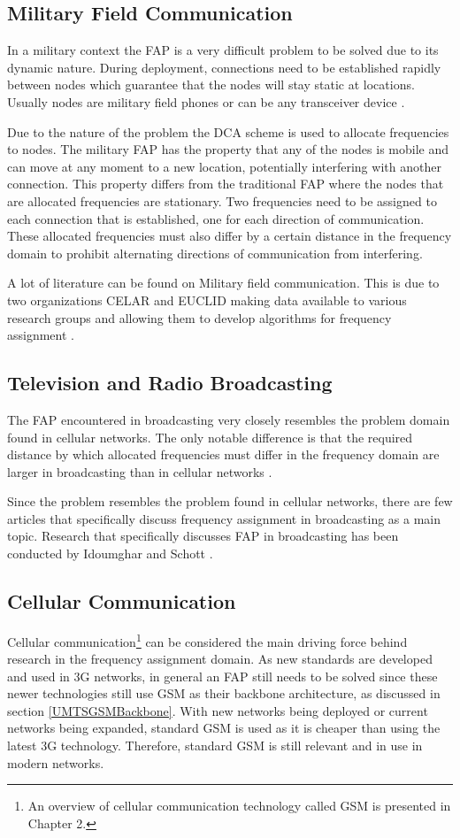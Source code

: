 \subsection{Military Field Communication}
In a military context the FAP is a very difficult problem to be solved due to its dynamic nature\cite{CALMA}. During deployment, connections need to be established rapidly between nodes which guarantee that the nodes will stay static at locations. Usually nodes are military field phones or can be any transceiver device \cite{CALMA,DynamicFAP}. 

Due to the nature of the problem the DCA scheme is used to allocate frequencies to nodes. The military FAP has the property that any of the nodes is mobile and can move at any moment to a new location, potentially interfering with another connection\cite{CALMA,DynamicFAP}. This property differs from the traditional FAP where the nodes that are allocated frequencies are stationary\cite{CALMA}. Two frequencies need to be assigned to each connection that is established, one for each direction of communication. These allocated frequencies must also differ by a certain distance in the frequency domain to prohibit alternating directions of communication from interfering\cite{CALMA,DynamicFAP}.

A lot of literature can be found on Military field communication. This is due to two organizations CELAR and EUCLID making data available to various research groups and allowing them to develop algorithms for frequency assignment \cite{CALMA,DynamicFAP}. 

\subsection{Television and Radio Broadcasting}
The FAP encountered in broadcasting very closely resembles the problem domain found in cellular networks\cite{Karen2004}. The only notable difference is that the required distance by which allocated frequencies must differ in the frequency domain are larger in broadcasting than in cellular networks \cite{Karen2004}.

Since the problem resembles the problem found in cellular networks, there are few articles that specifically discuss frequency assignment in broadcasting as a main topic. Research that specifically discusses FAP in broadcasting has been conducted by Idoumghar and Schott \cite{RadioFAP}.
\subsection{Cellular Communication}
Cellular communication\footnote{An overview of cellular communication technology called GSM is presented in Chapter 2.} can be considered the main driving force behind research in the frequency assignment domain. As new standards are developed and used in 3G networks, in general an FAP still needs to be solved since these newer technologies still use GSM as their backbone architecture, as discussed in section \ref{UMTSGSMBackbone}. With new networks being deployed or current networks being expanded, standard GSM is used as it is cheaper than using the latest 3G technology. Therefore, standard GSM is still relevant and in use in modern networks.

